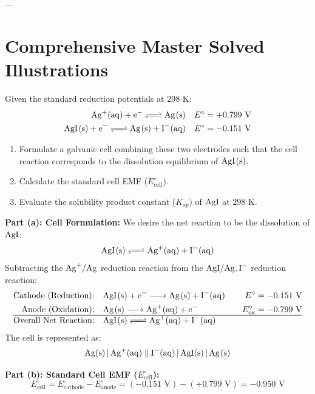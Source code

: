 ---

\section{Comprehensive Master Solved Illustrations}

\begin{examplebox}
Given the standard reduction potentials at $298\text{ K}$:
\begin{align*}
    \ce{Ag+(aq) + e^- <=> Ag(s)} \quad & E^\circ = +0.799\text{ V} \\
    \ce{AgI(s) + e^- <=> Ag(s) + I^-(aq)} \quad & E^\circ = -0.151\text{ V}
\end{align*}
\begin{enumerate}[label=(\alph*)]
    \item Formulate a galvanic cell combining these two electrodes such that the cell reaction corresponds to the dissolution equilibrium of $\ce{AgI(s)}$.
    \item Calculate the standard cell EMF ($E^\circ_{\text{cell}}$).
    \item Evaluate the solubility product constant ($K_{sp}$) of $\ce{AgI}$ at $298\text{ K}$.
\end{enumerate}
\tcblower
\textbf{Part (a): Cell Formulation:}
We desire the net reaction to be the dissolution of $\ce{AgI}$:
\begin{equation*}
    \ce{AgI(s) <=> Ag+(aq) + I^-(aq)}
\end{equation*}
Subtracting the $\ce{Ag+/Ag}$ reduction reaction from the $\ce{AgI/Ag,I-}$ reduction reaction:
\begin{align*}
    \text{Cathode (Reduction):} \quad & \ce{AgI(s) + e^- -> Ag(s) + I^-(aq)} \quad & E^\circ = -0.151\text{ V} \\
    \text{Anode (Oxidation):} \quad & \ce{Ag(s) -> Ag+(aq) + e^-} \quad & E^\circ_{\text{ox}} = -0.799\text{ V} \\
    \hline
    \text{Overall Net Reaction:} \quad & \ce{AgI(s) <=> Ag+(aq) + I^-(aq)} &
\end{align*}
The cell is represented as:
\begin{equation*}
    \ce{Ag(s) | Ag+(aq)} \parallel \ce{I^-(aq) | AgI(s) | Ag(s)}
\end{equation*}

\textbf{Part (b): Standard Cell EMF ($E^\circ_{\text{cell}}$):}
\begin{equation*}
    E^\circ_{\text{cell}} = E^\circ_{\text{cathode}} - E^\circ_{\text{anode}} = (-0.151\text{ V}) - (+0.799\text{ V}) = -0.950\text{ V}
\end{equation*}


\end{examplebox}
